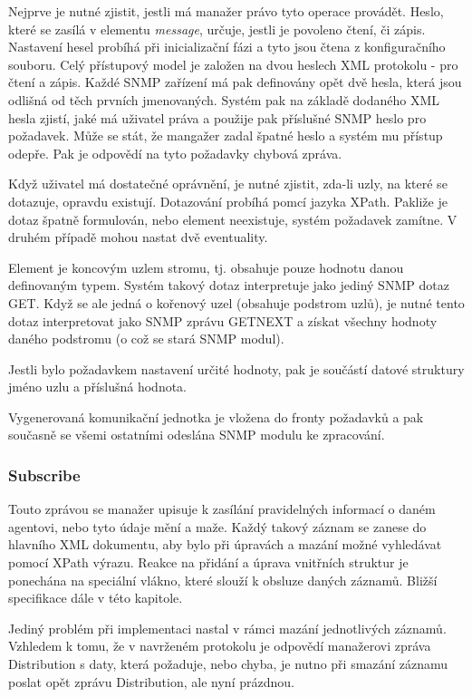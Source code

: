 Nejprve je nutné zjistit, jestli má manažer právo tyto operace provádět. Heslo, které se zasílá v elementu \textit{message}, určuje, jestli je
povoleno čtení, či zápis. Nastavení hesel probíhá při inicializační fázi a tyto jsou čtena z konfiguračního souboru. Celý přístupový model je
založen na dvou heslech XML protokolu - pro čtení a zápis. Každé SNMP zařízení má pak definovány opět dvě hesla, která jsou odlišná od těch prvních jmenovaných.
Systém pak na základě dodaného XML hesla zjistí, jaké má uživatel práva a použije pak příslušné SNMP heslo pro požadavek. Může se stát, že mangažer zadal
špatné heslo a systém mu přístup odepře. Pak je odpovědí na tyto požadavky chybová zpráva.

Když uživatel má dostatečné oprávnění, je nutné zjistit, zda-li uzly, na které se dotazuje, opravdu existují. Dotazování probíhá pomcí jazyka XPath.
Pakliže je dotaz špatně formulován, nebo element neexistuje, systém požadavek zamítne. V druhém případě mohou nastat dvě eventuality.

Element je koncovým uzlem stromu, tj. obsahuje pouze hodnotu danou definovaným typem. Systém takový dotaz interpretuje jako jediný SNMP dotaz GET.
Když se ale jedná o kořenový uzel (obsahuje podstrom uzlů), je nutné tento dotaz interpretovat jako
SNMP zprávu GETNEXT a získat všechny hodnoty daného podstromu (o což se stará SNMP modul).

Jestli bylo požadavkem nastavení určité hodnoty, pak je součástí datové struktury jméno uzlu a příslušná hodnota.

Vygenerovaná komunikační jednotka je vložena do fronty požadavků a pak současně se všemi ostatními odeslána SNMP modulu ke zpracování.

\subsubsection*{Subscribe}
Touto zprávou se manažer upisuje k zasílání pravidelných informací o daném agentovi, nebo tyto údaje mění a maže. Každý takový záznam
se zanese do hlavního XML dokumentu, aby bylo při úpravách a mazání možné vyhledávat pomocí XPath výrazu. Reakce na přidání a úprava
vnitřních struktur je ponechána na speciální vlákno, které slouží k obsluze daných záznamů. Bližší specifikace dále v této kapitole.

Jediný problém při implementaci nastal v rámci mazání jednotlivých záznamů. Vzhledem k tomu, že v navrženém protokolu je odpovědí
manažerovi zpráva Distribution s daty, která požaduje, nebo chyba, je nutno při smazání záznamu poslat opět zprávu Distribution, ale nyní
prázdnou.

